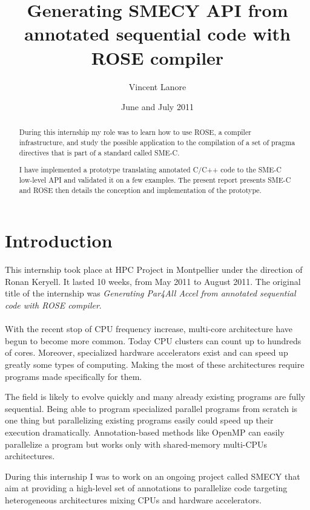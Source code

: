 \documentclass [A4]{article}
\title{Generating SMECY API from annotated sequential code with ROSE compiler}
\author{Vincent \sc Lanore}
\date{June and July 2011}
\begin{document}
	\maketitle
	
	\begin{abstract}
		During this internship my role was to learn how to use ROSE, a compiler infrastructure, and study the possible application to the compilation of a set of pragma directives that is part of a standard called SME-C.
		
		I have implemented a prototype translating annotated C/C++ code to the SME-C low-level API and validated it on a few examples. The present report presents SME-C and ROSE then details the conception and implementation of the prototype.
	\end{abstract}
	
	\newpage
	\tableofcontents
	\newpage
	
\section*{Introduction}
	This internship took place at HPC Project in Montpellier under the direction of Ronan Keryell. It lasted 10 weeks, from May 2011 to August 2011. The original title of the internship was \emph{Generating Par4All Accel from annotated sequential code with ROSE compiler}.
	
	\paragraph{}With the recent stop of CPU frequency increase, multi-core architecture have begun to become more common. Today CPU clusters can count up to hundreds of cores. Moreover, specialized hardware accelerators exist and can speed up greatly some types of computing.  Making the most of these architectures require programs made specifically for them. 
	
	The field is likely to evolve quickly and many already existing programs are fully sequential. Being able to program specialized parallel programs from scratch is one thing but parallelizing existing programs easily could speed up their execution dramatically. Annotation-based methods like OpenMP can easily parallelize a program but works only with shared-memory multi-CPUs architectures.
	
	During this internship I was to work on an ongoing project called SMECY that aim at providing a high-level set of annotations to parallelize code targeting heterogeneous architectures mixing CPUs and hardware accelerators.
	
\end{document}
